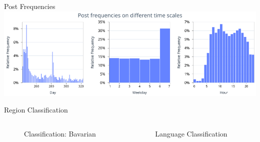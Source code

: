 \begin{frame}{Post Frequencies}
	\includegraphics[width=\linewidth, keepaspectratio]{pictures/paper/sentiments/visualization_valid_posts_frequency.png}
\end{frame}

\begin{frame}{Region Classification}
	\begin{columns}
		
		\begin{column}{0.55\textwidth}
			\begin{tcolorbox}[enhanced jigsaw, colback=white, opacityback=.4, colframe=ElixirPurple, arc=3mm, boxrule=0mm, height=0.8\textheight, valign=center, title=Text Cleaning]
				\begin{figure}[htbp]
					\centering
					\resizebox{\columnwidth}{!}{}
					\caption{Classification: Bavarian}
				\end{figure}
			\end{tcolorbox}
		\end{column}
		
		\begin{column}{0.55\textwidth}
			\begin{tcolorbox}[enhanced jigsaw, colback=white, opacityback=.4, colframe=ElixirPurple, arc=3mm, boxrule=0mm, height=0.8\textheight, valign=center, title=Post Selection]
				
				\begin{figure}[htbp]
					\centering
					\resizebox{\columnwidth}{!}{}
					\caption{Language Classification}
				\end{figure}
			\end{tcolorbox}
		\end{column}
	\end{columns}
\end{frame}